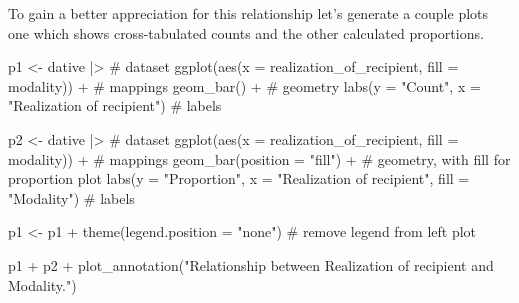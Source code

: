 \documentclass[
  letterpaper,
]{latex/krantz}
\newenvironment{Shaded}{\begin{snugshade}}{\end{snugshade}}
\newcommand{\AttributeTok}[1]{\textcolor[rgb]{0.40,0.45,0.13}{#1}}
\newcommand{\CommentTok}[1]{\textcolor[rgb]{0.37,0.37,0.37}{#1}}
\newcommand{\FunctionTok}[1]{\textcolor[rgb]{0.28,0.35,0.67}{#1}}
\newcommand{\NormalTok}[1]{\textcolor[rgb]{0.00,0.23,0.31}{#1}}
\newcommand{\OtherTok}[1]{\textcolor[rgb]{0.00,0.23,0.31}{#1}}
\newcommand{\SpecialCharTok}[1]{\textcolor[rgb]{0.37,0.37,0.37}{#1}}
\newcommand{\StringTok}[1]{\textcolor[rgb]{0.13,0.47,0.30}{#1}}
\begin{document}
To gain a better appreciation for this relationship let's generate a
couple plots one which shows cross-tabulated counts and the other
calculated proportions.

\begin{Shaded}
\begin{Highlighting}[]
\NormalTok{p1 }\OtherTok{\textless{}{-}} 
\NormalTok{  dative }\SpecialCharTok{|\textgreater{}} \CommentTok{\# dataset}
  \FunctionTok{ggplot}\NormalTok{(}\FunctionTok{aes}\NormalTok{(}\AttributeTok{x =}\NormalTok{ realization\_of\_recipient, }\AttributeTok{fill =}\NormalTok{ modality)) }\SpecialCharTok{+} \CommentTok{\# mappings}
  \FunctionTok{geom\_bar}\NormalTok{() }\SpecialCharTok{+} \CommentTok{\# geometry}
  \FunctionTok{labs}\NormalTok{(}\AttributeTok{y =} \StringTok{"Count"}\NormalTok{, }\AttributeTok{x =} \StringTok{"Realization of recipient"}\NormalTok{) }\CommentTok{\# labels}

\NormalTok{p2 }\OtherTok{\textless{}{-}} 
\NormalTok{  dative }\SpecialCharTok{|\textgreater{}} \CommentTok{\# dataset}
  \FunctionTok{ggplot}\NormalTok{(}\FunctionTok{aes}\NormalTok{(}\AttributeTok{x =}\NormalTok{ realization\_of\_recipient, }\AttributeTok{fill =}\NormalTok{ modality)) }\SpecialCharTok{+} \CommentTok{\# mappings}
  \FunctionTok{geom\_bar}\NormalTok{(}\AttributeTok{position =} \StringTok{"fill"}\NormalTok{) }\SpecialCharTok{+} \CommentTok{\# geometry, with fill for proportion plot}
  \FunctionTok{labs}\NormalTok{(}\AttributeTok{y =} \StringTok{"Proportion"}\NormalTok{, }\AttributeTok{x =} \StringTok{"Realization of recipient"}\NormalTok{, }\AttributeTok{fill =} \StringTok{"Modality"}\NormalTok{) }\CommentTok{\# labels}

\NormalTok{p1 }\OtherTok{\textless{}{-}}\NormalTok{ p1 }\SpecialCharTok{+} \FunctionTok{theme}\NormalTok{(}\AttributeTok{legend.position =} \StringTok{"none"}\NormalTok{) }\CommentTok{\# remove legend from left plot}

\NormalTok{p1 }\SpecialCharTok{+}\NormalTok{ p2 }\SpecialCharTok{+} \FunctionTok{plot\_annotation}\NormalTok{(}\StringTok{"Relationship between Realization of recipient and Modality."}\NormalTok{)}
\end{Highlighting}
\end{Shaded}
\end{document}
